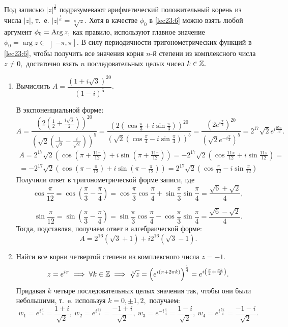 \documentclass[../../main.tex]{subfiles}
\begin{document}
	Под записью $|z|^{\frac{1}{n}}$ подразумевают арифметический положительный
	корень из числа $|z|$, т.~е. $|z|^{\frac{1}{n}} = \sqrt[n]{z}.$ Хотя в
	качестве ${\phi}_0$ в \eqref{lec23:6} можно взять любой аргумент 
	${\phi}_0 = \operatorname{Arg} z,$ как правило, используют главное значение 
	${\phi}_0 = \arg z \in \left]-\pi, \pi\right].$ В силу периодичности 
	тригонометрических
	функций в \eqref{lec23:6}, чтобы получить все значения корня $n$-й степени
	из комплексного числа $z\neq 0,$ достаточно взять $n$ последовательных целых
	чисел $k\in\mathbb{Z}.$
	
			\begin{examples}
		\;
		\begin{enumerate}
			\item Вычислить $A=\dfrac{(1+i\sqrt{3})^{20}}{(1-i)^5}.$
			
			В экспоненциальной форме:
			\[A = \frac{\left(2\left(\frac{1}{2}+\frac{i\sqrt{3}}{2}\right)
				\right)^{20}}{\left(\sqrt{2}\left(\frac{1}{\sqrt{2}}-\frac{i}
				{\sqrt{2}}\right)\right)^5} = \frac{\left(2\left(\cos \frac{\pi}
				{3}+i\sin \frac{\pi}{3}\right)\right)^{20}}{\left(\sqrt{2}\left(
				\cos \frac{\pi}{4}-i\sin \frac{\pi}{4}\right)\right)^5} =
			 \frac{\left(2e^{i\frac{\pi}{3}}\right)^{20}}{\left(\sqrt{2}
				e^{-i\frac{\pi}{4}}\right)^{5}} = 2^{17}\sqrt{2}e^
			{i\frac{95\pi}{12}}.\]
			\begin{multline*}A = 2^{17}\sqrt{2}\left(\cos \left(\pi+\frac{11\pi}
			{12}\right)+i\sin \left(\pi+\frac{11\pi}{12}\right)\right)= -2^{17}
			\sqrt{2}\left(\cos \frac{11\pi}{12}+i\sin \frac{11\pi}{12}\right)
			 = \\=-2^{17}\sqrt{2}\left(\cos \left(\pi-\frac{\pi}{12}\right)+
			 i\sin \left(\pi-\frac{\pi}{12}\right)\right)=2^{17}\sqrt{2}\left(
			 \cos \frac{\pi}{12}-i\sin \frac{\pi}{12}\right)\end{multline*}
			  Получили ответ в тригонометрической форме записи, где
			\[\cos \frac{\pi}{12} = \cos \left(\frac{\pi}{3} - 
			\frac{\pi}{4}\right) = \cos \frac{\pi}{3} \cos \frac{\pi}{4}
			+ \sin \frac{\pi}{3} \sin\frac{\pi}{4} =\frac{\sqrt{6}+\sqrt{2}}{4}
			,\]
			 
			 \[ \sin \frac{\pi}{12} = \sin \left(\frac{\pi}{3} - 
			 \frac{\pi}{4}\right) = \sin \frac{\pi}{3} \cos \frac{\pi}{4}
			 - \cos \frac{\pi}{3} \sin\frac{\pi}{4} =\frac{\sqrt{6}-
			 \sqrt{2}}{4}.\] Тогда,
			  подставляя, получаем ответ в алгебраической форме:
			 \[A =  2^{16}(\sqrt{3}+1) + i 2^{16}(\sqrt{3}-1).\]
		\item Найти все корни четвертой степени из комплексного числа $z = -1.$
		\[z = e^{i\pi} \implies \forall k\in\mathbb{Z} \implies \sqrt[4]{z} =
		\left(e^{i(\pi+2\pi k)}\right)^{\frac{1}{4}} = e^{i\left(
			\frac{\pi}{4}+\frac{\pi k}{2}\right)}.  \]
		Придавая $k$ четыре последовательных целых значения так, чтобы они были 
		небольшими, т.~e. используя $k = 0, \pm 1, 2,$ получаем:
		\[w_1 = e^{i\frac{\pi}{4}} = \frac{1+i}{\sqrt{2}},\ w_2 = 
		e^{i\frac{3\pi}{4}} = \frac{-1+i}{\sqrt{2}},\
		w_3 = e^{-i\frac{\pi}{4}} = \frac{1-i}{\sqrt{2}},\ w_4 = 
		e^{i\frac{5\pi}{4}} = \frac{-1-i}{\sqrt{2}}.\]
		

\end{enumerate}
\end{examples}
\end{document}
